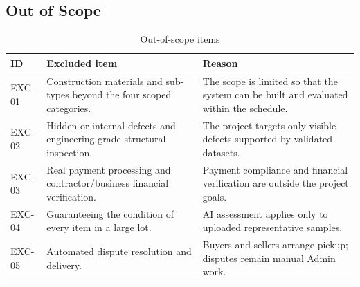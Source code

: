 \subsection{Out of Scope }
\begin{table}[H]
\centering
\caption{Out-of-scope items}
\label{tab:out-of-scope}
\begin{tabularx}{\textwidth}{@{}p{}X X@{}}
\toprule
\textbf{ID} & \textbf{Excluded item} & \textbf{Reason} \\
\midrule
EXC-01 & Construction materials and sub-types beyond the four scoped categories. & The scope is limited so that the system can be built and evaluated within the schedule. \\
EXC-02 & Hidden or internal defects and engineering-grade structural inspection. & The project targets only visible defects supported by validated datasets. \\
EXC-03 & Real payment processing and contractor/business financial verification. & Payment compliance and financial verification are outside the project goals. \\
EXC-04 & Guaranteeing the condition of every item in a large lot. & AI assessment applies only to uploaded representative samples. \\
EXC-05 & Automated dispute resolution and delivery. & Buyers and sellers arrange pickup; disputes remain manual Admin work. \\
\bottomrule
\end{tabularx}
\end{table}

